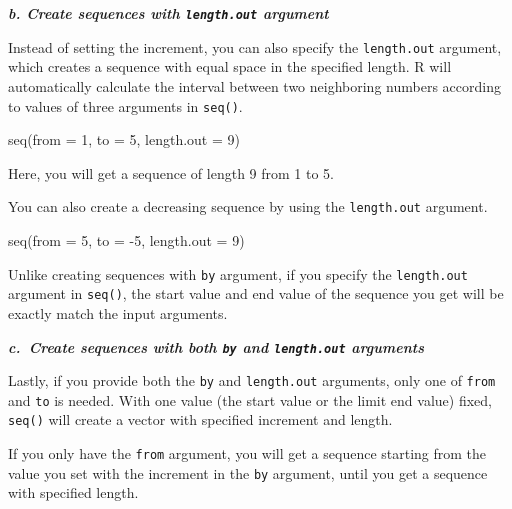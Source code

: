 \documentclass[
]{book}
\newenvironment{Shaded}{\begin{snugshade}}{\end{snugshade}}
\newcommand{\AttributeTok}[1]{\textcolor[rgb]{0.77,0.63,0.00}{#1}}
\newcommand{\DecValTok}[1]{\textcolor[rgb]{0.00,0.00,0.81}{#1}}
\newcommand{\FunctionTok}[1]{\textcolor[rgb]{0.00,0.00,0.00}{#1}}
\newcommand{\NormalTok}[1]{#1}
\newcommand{\SpecialCharTok}[1]{\textcolor[rgb]{0.00,0.00,0.00}{#1}}
\newenvironment{infobox}[1]
  {
  \begin{itemize}
  \renewcommand{\labelitemi}{
    \raisebox{-.7\height}[0pt][0pt]{
      {\setkeys{Gin}{width=3em,keepaspectratio}
        \texttt{[image: pics/\#1]}}
    }
  }
  \setlength{\fboxsep}{1em}
  \begin{blackbox}
  \item
  }
  {
  \end{blackbox}
  \end{itemize}
  }
\newenvironment{blackbox}{
  \definecolor{shadecolor}{rgb}{0, 0, 0}  %
  \color{white}
  \begin{shaded}}
 {\end{shaded}}
\begin{document}
\textbf{\emph{b. Create sequences with \texttt{length.out} argument}}

Instead of setting the increment, you can also specify the \texttt{length.out} argument, which creates a sequence with equal space in the specified length. R will automatically calculate the interval between two neighboring numbers according to values of three arguments in \texttt{seq()}.

\begin{Shaded}
\begin{Highlighting}[]
\FunctionTok{seq}\NormalTok{(}\AttributeTok{from =} \DecValTok{1}\NormalTok{, }\AttributeTok{to =} \DecValTok{5}\NormalTok{, }\AttributeTok{length.out =} \DecValTok{9}\NormalTok{) }
\end{Highlighting}
\end{Shaded}

Here, you will get a sequence of length 9 from 1 to 5.

You can also create a decreasing sequence by using the \texttt{length.out} argument.

\begin{Shaded}
\begin{Highlighting}[]
\FunctionTok{seq}\NormalTok{(}\AttributeTok{from =} \DecValTok{5}\NormalTok{, }\AttributeTok{to =} \SpecialCharTok{{-}}\DecValTok{5}\NormalTok{, }\AttributeTok{length.out =} \DecValTok{9}\NormalTok{) }
\end{Highlighting}
\end{Shaded}

\begin{infobox}{caution}
Unlike creating sequences with \texttt{by} argument, if you specify the \texttt{length.out} argument in \texttt{seq()}, the start value and end value of the sequence you get will be exactly match the input arguments.

\end{infobox}

\textbf{\emph{c.~Create sequences with both \texttt{by} and \texttt{length.out} arguments}}

Lastly, if you provide both the \texttt{by} and \texttt{length.out} arguments, only one of \texttt{from} and \texttt{to} is needed. With one value (the start value or the limit end value) fixed, \texttt{seq()} will create a vector with specified increment and length.

If you only have the \texttt{from} argument, you will get a sequence starting from the value you set with the increment in the \texttt{by} argument, until you get a sequence with specified length.
\end{document}
